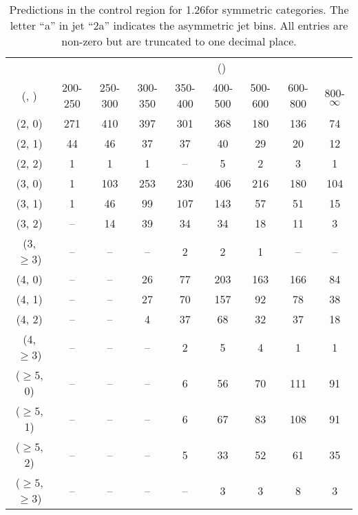 \begin{table}[h!]
\tiny
\centering
\caption{Predictions in the \mj control region for 1.26\ifb for symmetric categories. The letter ``a'' in jet \eg ``2a''  indicates the asymmetric jet bins. All entries are non-zero but are truncated to one decimal place.\label{tab:predsep_mu_data_sym}}
\begin{tabular}
{ccccccccc}
	\hline\hline
&	& \multicolumn{8}{c}{\scalht (\gev)} \\ 
	 (\njet,  \nb) & 200-250 & 250-300 & 300-350 & 350-400 & 400-500 & 500-600 & 600-800 & 800-$\infty$ \\ [0.8ex] 
\hline
	(2, 0) & 271 & 410 & 397 & 301 & 368 & 180 & 136 & 74 \\[0.5ex] 
	(2, 1) & 44 & 46 & 37 & 37 & 40 & 29 & 20 & 12 \\[0.5ex] 
	(2, 2) & 1 & 1 & 1 & -- & 5 & 2 & 3 & 1 \\[0.5ex] 
	(3, 0) & 1 & 103 & 253 & 230 & 406 & 216 & 180 & 104 \\[0.5ex] 
	(3, 1) & 1 & 46 & 99 & 107 & 143 & 57 & 51 & 15 \\[0.5ex] 
	(3, 2) & -- & 14 & 39 & 34 & 34 & 18 & 11 & 3 \\[0.5ex] 
	(3, $\ge3$) & -- & -- & -- & 2 & 2 & 1 & -- & -- \\[0.5ex] 
	(4, 0) & -- & -- & 26 & 77 & 203 & 163 & 166 & 84 \\[0.5ex] 
	(4, 1) & -- & -- & 27 & 70 & 157 & 92 & 78 & 38 \\[0.5ex] 
	(4, 2) & -- & -- & 4 & 37 & 68 & 32 & 37 & 18 \\[0.5ex] 
	(4, $\ge3$) & -- & -- & -- & 2 & 5 & 4 & 1 & 1 \\[0.5ex] 
	($\ge5$, 0) & -- & -- & -- & 6 & 56 & 70 & 111 & 91 \\[0.5ex] 
	($\ge5$, 1) & -- & -- & -- & 6 & 67 & 83 & 108 & 91 \\[0.5ex] 
	($\ge5$, 2) & -- & -- & -- & 5 & 33 & 52 & 61 & 35 \\[0.5ex] 
	($\ge5$, $\ge3$) & -- & -- & -- & -- & 3 & 3 & 8 & 3 \\[0.5ex] 
	\hline
	\hline
\end{tabular}
\end{table}
